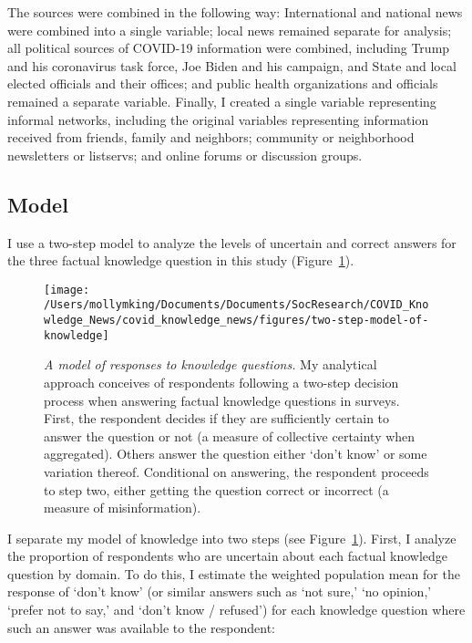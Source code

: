 \documentclass[11pt]{article}
\begin{document}
The sources were combined in the following way: International and national news
were combined into a single variable; local news remained separate for analysis;
all political sources of COVID-19 information were combined, including Trump and
his coronavirus task force, Joe Biden and his campaign, and State and local
elected officials and their offices; and public health organizations and
officials remained a separate variable. Finally, I created a single variable
representing informal networks, including the original variables representing
information received from friends, family and neighbors; community or
neighborhood newsletters or listservs; and online forums or discussion groups.


\subsection{Model}\label{sec:model}

I use a two-step model to analyze the levels of uncertain and correct answers
for the three factual knowledge question in this study
(Figure~\ref{fig:TwoStepModelOfKnowledge}).


\begin{figure}[ht]
  \begin{center}
    \texttt{[image: /Users/mollymking/Documents/Documents/SocResearch/COVID\_Knowledge\_News/covid\_knowledge\_news/figures/two-step-model-of-knowledge]}
  \end{center}
  \caption[A model of responses to knowledge questions]
  {\emph{A model of responses to knowledge questions.}
   My analytical approach conceives of respondents following a two-step decision
   process when answering factual knowledge questions in surveys. First, the
   respondent decides if they are sufficiently certain to answer the question or
   not (a measure of collective certainty when aggregated). Others answer the
   question either `don't know' or some variation thereof. Conditional on
   answering, the respondent proceeds to step two, either getting the question
   correct or incorrect (a measure of misinformation).}
  \label{fig:TwoStepModelOfKnowledge}
\end{figure}


I separate my model of knowledge into two steps (see
Figure~\ref{fig:TwoStepModelOfKnowledge}). First, I analyze the proportion of
respondents who are uncertain about each factual knowledge question by domain.
To do this, I estimate the weighted population mean for the response of `don't
know' (or similar answers such as `not sure,' `no opinion,' `prefer not to say,'
and `don't know / refused') for each knowledge question where such an answer was
available to the respondent:
\end{document}
